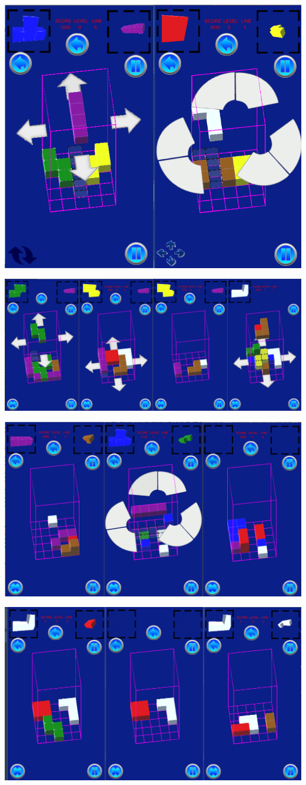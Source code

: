 \documentclass[9pt, b5paper]{article}
\begin{document}
\includegraphics[width=.9\linewidth]{./pic/readme_20221105_142752.png}

\includegraphics[width=.9\linewidth]{./pic/readme_20221104_102732.png}

\includegraphics[width=.9\linewidth]{./pic/readme_20221103_111227.png}

\includegraphics[width=.9\linewidth]{./pic/readme_20221102_272232.png}
\end{document}
